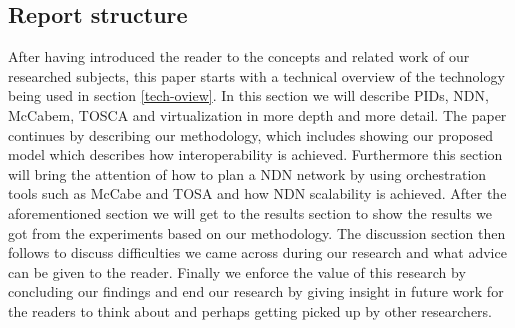 \subsection{Report structure}
After having introduced the reader to the concepts and related work of our researched subjects, this paper starts with a technical overview of the technology being used in section \ref{tech-oview}. In this section we will describe PIDs, NDN, McCabem, TOSCA and virtualization in more depth and more detail.
The paper continues by describing our methodology, which includes showing our proposed model which describes how interoperability is achieved. Furthermore this section will bring the attention of how to plan a NDN network by using orchestration tools such as McCabe and TOSA and how NDN scalability is achieved. 
After the aforementioned section we will get to the results section to show the results we got from the experiments based on our methodology.
The discussion section then follows to discuss difficulties we came across during our research and what advice can be given to the reader.
Finally we enforce the value of this research by concluding our findings and end our research by giving insight in future work for the readers to think about and perhaps getting picked up by other researchers. 

